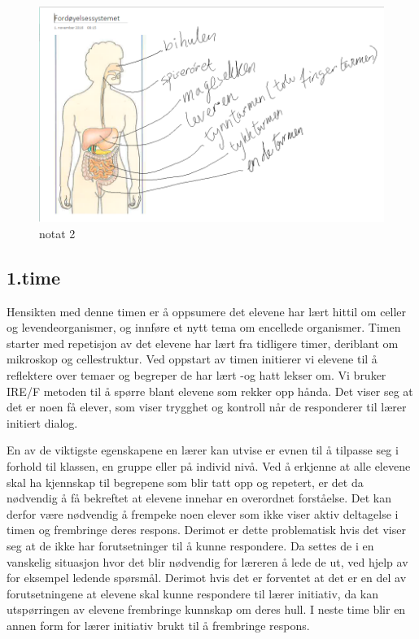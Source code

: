 \documentclass[main.tex]{subfiles}
\begin{document}
\begin{figure}[h!]
\includegraphics[scale = 0.6]{../figures/onenote_fordoyelse.png}
\caption{notat 2}
\label{fig:notat2}
\end{figure}

\subsection*{1.time}

Hensikten med denne timen er å oppsumere det elevene har lært hittil om celler og 
levendeorganismer, og innføre et nytt tema om encellede organismer. Timen starter med repetisjon 
av det elevene har lært fra tidligere timer, deriblant om mikroskop og cellestruktur. Ved oppstart 
av timen initierer vi elevene til å reflektere over temaer og begreper de har lært -og hatt lekser 
om. Vi bruker IRE/F metoden til å spørre blant elevene som rekker opp hånda. Det viser seg at det 
er noen få elever, som viser trygghet og kontroll når de responderer til lærer initiert dialog. 

En av de viktigste egenskapene en lærer kan utvise er evnen til å tilpasse seg i forhold til 
klassen, en gruppe eller på individ nivå. Ved å erkjenne at alle elevene skal ha kjennskap til 
begrepene som blir tatt opp og repetert, er det da nødvendig å få bekreftet at elevene innehar en 
overordnet forståelse. Det kan derfor være nødvendig å frempeke noen elever som ikke viser aktiv 
deltagelse i timen og frembringe deres respons. Derimot er dette problematisk hvis det viser seg at 
de ikke har forutsetninger til å kunne respondere. Da settes de i en vanskelig situasjon hvor det 
blir nødvendig for læreren å lede de ut, ved hjelp av for eksempel ledende spørsmål. Derimot hvis 
det er forventet at det er en del av forutsetningene at elevene skal kunne respondere til lærer 
initiativ, da kan utspørringen av elevene frembringe kunnskap om deres hull. I neste time blir en 
annen form for lærer initiativ brukt til å frembringe respons. 
 
\end{document}
